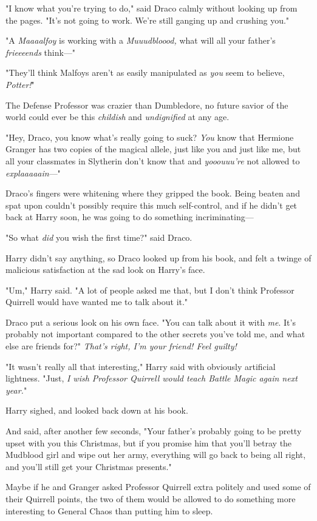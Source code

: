 "I know what you're trying to do," said Draco calmly without looking up from
the pages. "It's not going to work. We're still ganging up and crushing you."

"A \emph{Maaaalfoy} is working with a \emph{Muuudbloood,} what will all your
father's \emph{frieeeends} think—"

"They'll think Malfoys aren't as easily manipulated as \emph{you} seem to
believe, \emph{Potter!}"

The Defense Professor was crazier than Dumbledore, no future savior of the
world could ever be this \emph{childish} and \emph{undignified} at any age.

"Hey, Draco, you know what's really going to suck? \emph{You} know that
Hermione Granger has two copies of the magical allele, just like you and just
like me, but all your classmates in Slytherin don't know that and
\emph{yooouuu're} not allowed to \emph{explaaaaain}—"

Draco's fingers were whitening where they gripped the book. Being beaten and
spat upon couldn't possibly require this much self-control, and if he didn't
get back at Harry soon, he was going to do something incriminating—

"So what \emph{did} you wish the first time?" said Draco.

Harry didn't say anything, so Draco looked up from his book, and felt a twinge
of malicious satisfaction at the sad look on Harry's face.

"Um," Harry said. "A lot of people asked me that, but I don't think Professor
Quirrell would have wanted me to talk about it."

Draco put a serious look on his own face. "You can talk about it with
\emph{me}. It's probably not important compared to the other secrets you've
told me, and what else are friends for?" \emph{That's right, I'm your friend!
Feel guilty!}

"It wasn't really all that interesting," Harry said with obviously artificial
lightness. "Just, \emph{I wish Professor Quirrell would teach Battle Magic
again next year.}"

Harry sighed, and looked back down at his book.

And said, after another few seconds, "Your father's probably going to be pretty
upset with you this Christmas, but if you promise him that you'll betray the
Mudblood girl and wipe out her army, everything will go back to being all
right, and you'll still get your Christmas presents."

Maybe if he and Granger asked Professor Quirrell extra politely and used some
of their Quirrell points, the two of them would be allowed to do something more
interesting to General Chaos than putting him to sleep.
